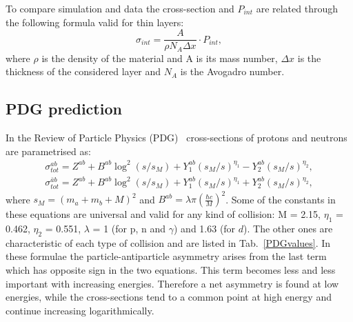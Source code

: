 To compare simulation and data the cross-section and $P_{int}$ are related through the following formula valid for thin layers:
%
\begin{equation}
\label{sigmaPint}
\sigma_{int} = \frac{A}{\rho N_A \Delta x} \cdot P_{int},
\end{equation}
%
where $\rho$ is the density of the material and A is its mass number, $\Delta x$ is the thickness of the considered layer and $N_A$ is the Avogadro number.

\subsection{PDG prediction}

In the Review of Particle Physics (PDG)~\cite{PDG2014} cross-sections of protons and neutrons are parametrised as:
%
\begin{align} 
\sigma_{tot}^{ab} = Z^{ab} + B^{ab}\log^2(s/s_M) + Y^{ab}_1(s_M/s)^{\eta_1} - Y^{ab}_2(s_M/s)^{\eta_2}, \\
\sigma^{\bar{a}b}_{tot} = Z^{ab} + B^{ab}\log^2(s/s_M) + Y^{ab}_1(s_M/s)^{\eta_1} + Y^{ab}_2(s_M/s)^{\eta_2},
\end{align}
%
where $s_M = (m_a + m_b + M)^2$ and $B^{ab} = \lambda \pi ( \frac{\hbar c }{M}  )^2$. Some of the constants in these 
equations are universal and valid for any kind of collision: M = 2.15, $\eta_1$ = 0.462, $\eta_2$ = 0.551, $\lambda$ = 1 
(for p, n and $\gamma$) and 1.63 (for $d$). The other ones are characteristic of each type of collision and are listed 
in Tab.~\ref{PDGvalues}. In these formulae the particle-antiparticle asymmetry arises from the last term which has opposite
sign in the two equations. This term becomes less and less important with increasing energies. Therefore a net asymmetry 
is found at low energies, while the cross-sections tend to a common point at high energy and continue increasing logarithmically.
%
\begin{center}
\begin{table}[b]
\centering
{}
\caption{Values for the constants $Z^{ab}$, $Y^{ab}_1$ and $Y^{ab}_2$~\cite{PDG2014}, 
which parametrise hadronic cross-sections. }
\end{table}
\label{PDGvalues}
\end{center}


